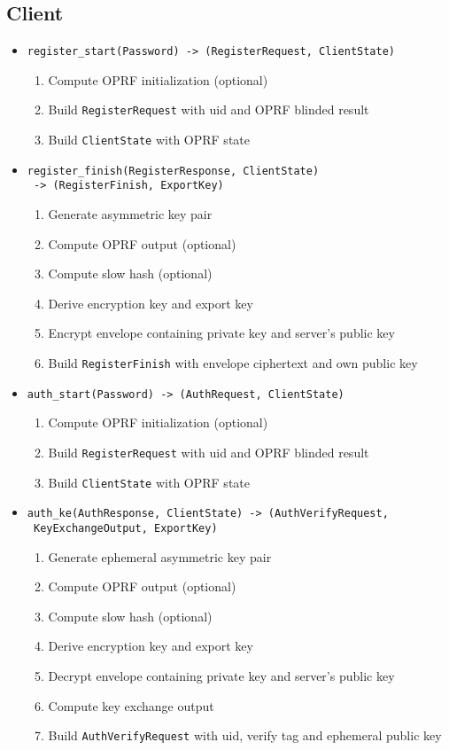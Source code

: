 \documentclass[../report.tex]{subfiles}
\begin{document}
\subsection{Client}
\begin{itemize}
 \item \verb|register_start(Password) -> (RegisterRequest, ClientState)|
  \begin{enumerate}
    \item Compute OPRF initialization (optional)
    \item Build \verb|RegisterRequest| with uid and OPRF blinded result
    \item Build \verb|ClientState| with OPRF state
  \end{enumerate}
  
 \item \verb|register_finish(RegisterResponse, ClientState)|\\
       \verb| -> (RegisterFinish, ExportKey)|
  \begin{enumerate}
    \item Generate asymmetric key pair
    \item Compute OPRF output (optional)
    \item Compute slow hash (optional)
    \item Derive encryption key and export key
    \item Encrypt envelope containing private key and server's public key
    \item Build \verb|RegisterFinish| with envelope ciphertext and own public key
  \end{enumerate}
 
 
 
 \item \verb|auth_start(Password) -> (AuthRequest, ClientState)|
   \begin{enumerate}
    \item Compute OPRF initialization (optional)
    \item Build \verb|RegisterRequest| with uid and OPRF blinded result
    \item Build \verb|ClientState| with OPRF state
  \end{enumerate}
  
 \item \verb|auth_ke(AuthResponse, ClientState) -> (AuthVerifyRequest,|\\
       \verb| KeyExchangeOutput, ExportKey)|
  \begin{enumerate}
    \item Generate ephemeral asymmetric key pair
    \item Compute OPRF output (optional)
    \item Compute slow hash (optional)
    \item Derive encryption key and export key
    \item Decrypt envelope containing private key and server's public key
    \item Compute key exchange output
    \item Build \verb|AuthVerifyRequest| with uid, verify tag and ephemeral public key
  \end{enumerate}
 

\end{itemize}
\end{document}
